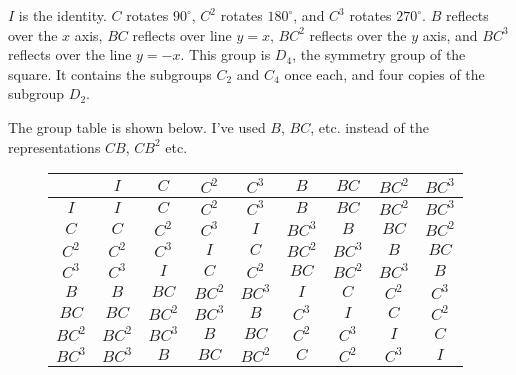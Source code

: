 \documentclass[../gatm.tex]{subfiles}
\begin{document}
\noindent$I$ is the identity. $C$ rotates $90^\circ$, $C^2$ rotates $180^\circ$, and $C^3$ rotates $270^\circ$. $B$ reflects over the $x$ axis, $BC$ reflects over line $y=x$, $BC^2$ reflects over the $y$ axis, and $BC^3$ reflects over the line $y=-x$. This group is $D_4$, the symmetry group of the square. It contains the subgroups $C_2$ and $C_4$ once each, and four copies of the subgroup $D_2$.

The group table is shown below. I've used $B$, $BC$, etc. instead of the representations $CB$, $CB^2$ etc.

\begin{figure}[h]
	\begin{center}
		\begin{minipage}[b]{\textwidth}
			\centering
			\begin{tabular}{c|cccccccc}
				\hline
				& $I$ & $C$ & $C^2$ & $C^3$ & $B$ & $BC$ & $BC^2$ & $BC^3$ \\ \hline
				\rowcolor{light-gray}
				$I$ & $I$ & $C$ & $C^2$ & $C^3$ & $B$ & $BC$ & $BC^2$ & $BC^3$ \\
				$C$ & $C$ & $C^2$ & $C^3$ & $I$ & $BC^3$ & $B$ & $BC$ & $BC^2$ \\
				\rowcolor{light-gray}
				$C^2$ & $C^2$ & $C^3$ & $I$ & $C$ & $BC^2$ & $BC^3$ & $B$ & $BC$ \\
				$C^3$ & $C^3$ & $I$ & $C$ & $C^2$ & $BC$ & $BC^2$ & $BC^3$ & $B$ \\
				\rowcolor{light-gray}
				$B$ & $B$ & $BC$ & $BC^2$ & $BC^3$ & $I$ & $C$ & $C^2$ & $C^3$ \\
				$BC$ & $BC$ & $BC^2$ & $BC^3$ & $B$ & $C^3$ & $I$ & $C$ & $C^2$ \\
				\rowcolor{light-gray}
				$BC^2$ & $BC^2$ & $BC^3$ & $B$ & $BC$ & $C^2$ & $C^3$ & $I$ & $C$ \\
				$BC^3$ & $BC^3$ & $B$ & $BC$ & $BC^2$ & $C$ & $C^2$ & $C^3$ & $I$ \\ \hline
			\end{tabular}
			\vspace*{0.5\baselineskip}
		\end{minipage}
	\end{center}
\end{figure}

\vspace*{-2\baselineskip}
\end{document}
